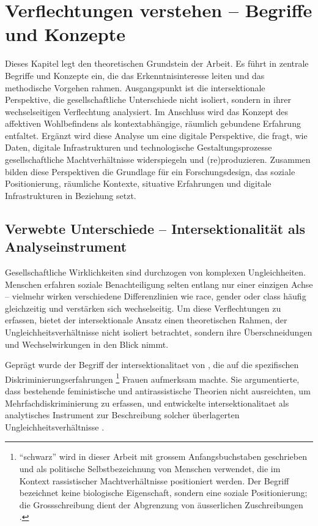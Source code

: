 
\chapter{Verflechtungen verstehen -- Begriffe und Konzepte} \label{sec:theoretischer_rahmen}

Dieses Kapitel legt den theoretischen Grundstein der Arbeit. Es führt in zentrale Begriffe und Konzepte ein, die das Erkenntnisinteresse leiten und das methodische Vorgehen rahmen. Ausgangspunkt ist die intersektionale Perspektive, die gesellschaftliche Unterschiede nicht isoliert, sondern in ihrer wechselseitigen Verflechtung analysiert. Im Anschluss wird das Konzept des affektiven Wohlbefindens als kontextabhängige, räumlich gebundene Erfahrung entfaltet. Ergänzt wird diese Analyse um eine digitale Perspektive, die fragt, wie Daten, digitale Infrastrukturen und technologische Gestaltungsprozesse gesellschaftliche Machtverhältnisse widerspiegeln und (re)produzieren. Zusammen bilden diese Perspektiven die Grundlage für ein Forschungsdesign, das soziale Positionierung, räumliche Kontexte, situative Erfahrungen und digitale Infrastrukturen in Beziehung setzt.

\section{Verwebte Unterschiede -- Intersektionalität als Analyseinstrument}

Gesellschaftliche Wirklichkeiten sind durchzogen von komplexen Ungleichheiten. Menschen erfahren soziale Benachteiligung selten entlang nur einer einzigen Achse -- vielmehr wirken verschiedene Differenzlinien wie \gls{race}, \gls{gender} oder \gls{class} häufig gleichzeitig und verstärken sich wechselseitig. Um diese Verflechtungen zu erfassen, bietet der intersektionale Ansatz einen theoretischen Rahmen, der Ungleichheitsverhältnisse nicht isoliert betrachtet, sondern ihre Überschneidungen und Wechselwirkungen in den Blick nimmt.

Geprägt wurde der Begriff der \gls{intersektionalitaet} von \textcite{crenshawMappingMarginsIntersectionality1991}, die auf die spezifischen Diskriminierungserfahrungen \emph{}\footnote{\enquote{\gls{schwarz}} wird in dieser Arbeit mit grossem Anfangsbuchstaben geschrieben und als politische Selbstbezeichnung von Menschen verwendet, die im Kontext rassistischer Machtverhältnisse positioniert werden. Der Begriff bezeichnet keine biologische Eigenschaft, sondern eine soziale Positionierung; die Grossschreibung dient der Abgrenzung von äusserlichen Zuschreibungen \parencite{oguntoyeFarbeBekennenAfrodeutsche1986}.} Frauen aufmerksam machte. Sie argumentierte, dass bestehende feministische und antirassistische Theorien nicht ausreichten, um Mehrfachdiskriminierung zu erfassen, und entwickelte \gls{intersektionalitaet} als analytisches Instrument zur Beschreibung solcher überlagerten Ungleichheitsverhältnisse \parencite[\gls{vgl}][]{hancockWhenMultiplicationDoesnt2007}.

